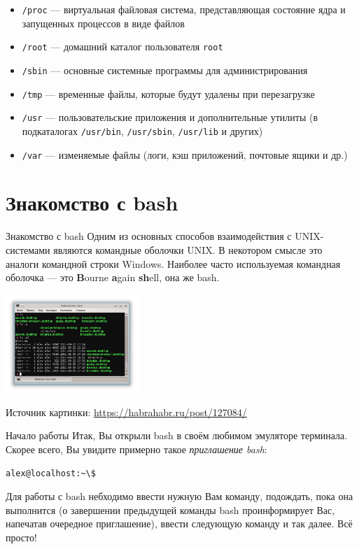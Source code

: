 \documentclass{beamer}
\begin{document}
\begin{frame}
	\begin{itemize}
		\item{\texttt{/proc} --- виртуальная файловая система, представляющая состояние ядра и запущенных процессов в виде файлов}\pause
		\item{\texttt{/root} --- домашний каталог пользователя \texttt{root}}\pause
		\item{\texttt{/sbin} --- основные системные программы для администрирования}\pause
		\item{\texttt{/tmp} --- временные файлы, которые будут удалены при перезагрузке}\pause
		\item{\texttt{/usr} --- пользовательские приложения и дополнительные утилиты (в подкаталогах \texttt{/usr/bin}, \texttt{/usr/sbin}, \texttt{/usr/lib} и других)}\pause
		\item{\texttt{/var} --- изменяемые файлы (логи, кэш приложений, почтовые ящики и др.)}
	\end{itemize}
\end{frame}

\section{Знакомство с bash}

\begin{frame}{Знакомство с bash}
		Одним из основных способов взаимодействия с UNIX-системами являются командные оболочки UNIX. В некотором смысле это аналоги командной строки Windows. Наиболее часто используемая командная оболочка --- это \textbf{B}ourne \textbf{a}gain \textbf{sh}ell, она же bash.
		
		\begin{center}
			\includegraphics[width=5cm]{bash}
			
			{\color{gray}\tiny Источник картинки: \color{blue}\url{https://habrahabr.ru/post/127084/}}
		\end{center}
\end{frame}

\begin{frame}[fragile]{Начало работы}
	Итак, Вы открыли bash в своём любимом эмуляторе терминала. Скорее всего, Вы увидите примерно такое \emph{приглашение bash}:
	\begin{Verbatim}[commandchars=\\\{\},codes={\catcode`$=3\catcode`^=7\catcode`_=8}]
alex@localhost:~\$
	\end{Verbatim}
	\pause
	Для работы с bash небходимо ввести нужную Вам команду, подождать, пока она выполнится (о завершении предыдущей команды bash проинформирует Вас, напечатав очередное приглашение), ввести следующую команду и так далее. Всё просто! 
\end{frame}
\end{document}
